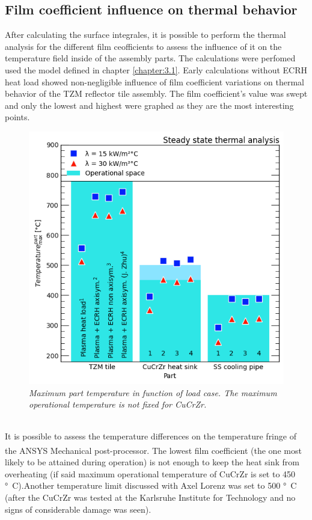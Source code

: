 \subsection{Film coefficient influence on thermal behavior}
\normalsize{After calculating the surface integrales, it is possible to perform the thermal analysis for the different film ceofficients to assess the influence of it on the temperature field inside of the assembly parts. The calculations were perfomed used the model defined in chapter \ref{chapter:3.1}. Early calculations without \acrshort{ECRH} heat load showed non-negligible influence of film coefficient variations on thermal behavior of the \acrshort{TZM} reflector tile assembly. The film coefficient's value was swept and only the lowest and highest were graphed as they are the most interesting points.}
\\
\begin{figure}[h!]
    \label{fig_5_7} 
    \centering
    \includegraphics[width=.6\textwidth]{figures/filmcoefficient15and30.png}
    \caption{\it Maximum part temperature in function of load case. The maximum operational temperature is not fixed for \acrshort{CuCrZr}.}
\end{figure}
\\
\normalsize{\indent It is possible to assess the temperature differences on the temperature fringe of the ANSYS\textsuperscript{\textregistered} Mechanical post-processor. The lowest film coefficient (the one most likely to be attained during operation) is not enough to keep the heat sink from overheating (if said maximum operational temperature of \acrshort{CuCrZr} is set to 450 \unit{\si{\degree}C}).Another temperature limit discussed with Axel Lorenz was set to 500 \unit{\si{\degree}C} (after the \acrshort{CuCrZr} was tested at the Karlsruhe Institute for Technology and no signs of considerable damage was seen).}
